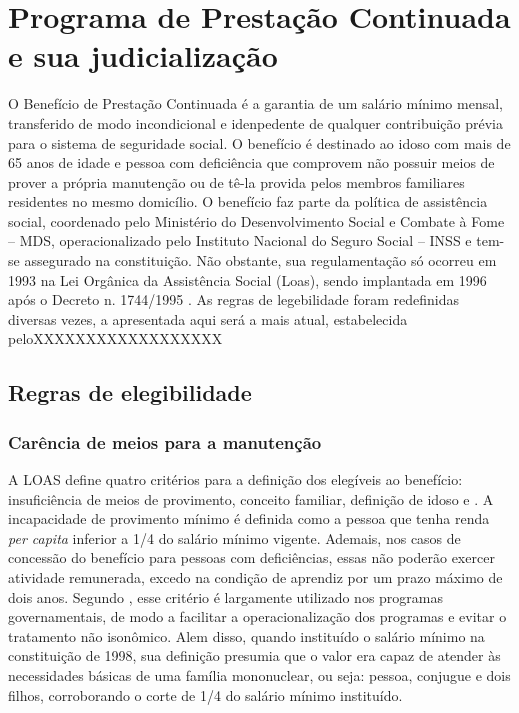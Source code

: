 \documentclass[
	12pt,				%
	openright,			%
	twoside,			%
	a4paper,			%
	english,			%
	french,				%
	spanish,			%
	brazil				%
	]{abntex2}
\begin{document}
\chapter{Programa de Prestação Continuada e sua judicialização}
O Benefício de Prestação Continuada é a garantia de um salário mínimo mensal, transferido de modo incondicional e idenpedente de qualquer contribuição prévia para o sistema de seguridade social. O benefício é destinado ao idoso com mais de 65 anos de idade e pessoa com deficiência que comprovem não possuir meios de prover a própria manutenção ou de tê-la provida pelos membros familiares residentes no mesmo domicílio. O benefício faz parte da política de assistência social, coordenado pelo Ministério do Desenvolvimento Social e Combate à Fome -- MDS, operacionalizado pelo Instituto Nacional do Seguro Social -- INSS e tem-se assegurado na constituição. Não obstante, sua regulamentação só ocorreu em 1993 na Lei Orgânica da Assistência Social (Loas), sendo implantada em 1996 após o Decreto n. 1744/1995 \cite{bpc_stf}. As regras de legebilidade foram redefinidas diversas vezes, a apresentada aqui será a mais atual, estabelecida peloXXXXXXXXXXXXXXXXXX


	\section{Regras de elegibilidade }
		\subsection{Carência de meios para a manutenção}
		A LOAS define quatro critérios para a definição dos elegíveis ao benefício: insuficiência de meios de provimento, conceito familiar, definição de idoso e  . A incapacidade de provimento mínimo é definida como a pessoa que tenha renda \textit{per capita} inferior a 1/4 do salário mínimo vigente. Ademais, nos casos de concessão do benefício para pessoas com deficiências, essas não poderão exercer atividade remunerada, excedo na condição de aprendiz por um prazo máximo de dois anos. Segundo , esse critério é largamente utilizado nos programas governamentais, de modo a facilitar a operacionalização dos programas e evitar o tratamento não isonômico. Alem disso, quando instituído o salário mínimo na constituição de 1998, sua definição presumia que o valor era capaz de atender às necessidades básicas de uma família mononuclear, ou seja: pessoa, conjugue e dois filhos, corroborando o corte de 1/4 do salário mínimo instituído.
		
\end{document}
